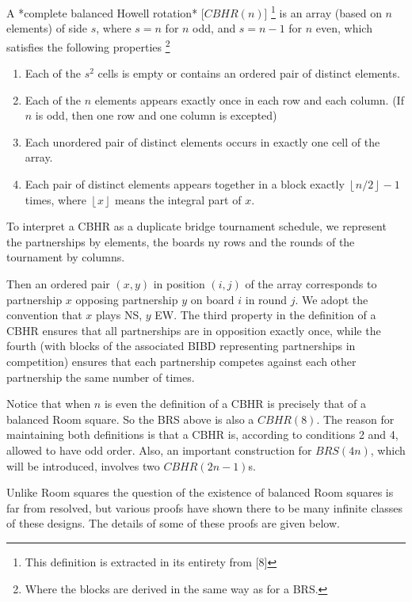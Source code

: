 \documentclass[11pt, a4paper]{book}\usepackage[]{graphicx}\usepackage[]{xcolor}
\begin{document}
A *complete balanced Howell rotation* [$CBHR(n)$]
\footnote{This definition is extracted in its entirety from [8]}
is an
array (based on $n$ elements) of side $s$, where $s = n$ for
$n$ odd, and $s = n-1$ for $n$ even, which satisfies the
following properties
\footnote{Where the blocks are derived in the same way as for a BRS.}

\begin{enumerate}
  \item{Each of the $s^2$ cells is empty or contains an ordered
    pair of distinct elements.}
  \item{Each of the $n$ elements appears exactly once in each
    row and each column. (If $n$ is odd, then one row and
    one column is excepted)}
  \item{Each unordered pair of distinct elements occurs in
    exactly one cell of the array.}
  \item{Each pair of distinct elements appears together in a
    block exactly $\left \lfloor{n/2}\right \rfloor -1$
    times, where $\left \lfloor{x}\right \rfloor$ means the
    integral part of $x$.}
\end{enumerate}

To interpret a CBHR as a duplicate bridge tournament
schedule, we represent the partnerships by elements, the
boards ny rows and the rounds of the tournament by columns.

Then an ordered pair $(x, y)$ in position $(i, j)$ of the
array corresponds to partnership $x$ opposing partnership
$y$ on board $i$ in round $j$. We adopt the convention that
$x$ plays NS, $y$ EW. The third property in the definition
of a CBHR ensures that all partnerships are in opposition
exactly once, while the fourth (with blocks of the
associated BIBD representing partnerships in competition)
ensures that each partnership competes against each other
partnership the same number of times.

Notice that when $n$ is even the definition of a CBHR is
precisely that of a balanced Room square. So the BRS above
is also a $CBHR(8)$. The reason for maintaining both
definitions is that a CBHR is, according to conditions 2 and
4, allowed to have odd order. Also, an important
construction for $BRS(4n)$, which will be introduced,
involves two $CBHR(2n - 1)$s.

Unlike Room squares the question of the existence of
balanced Room squares is far from resolved, but various
proofs have shown there to be many infinite classes of these
designs. The details of some of these proofs are given
below.
\end{document}
